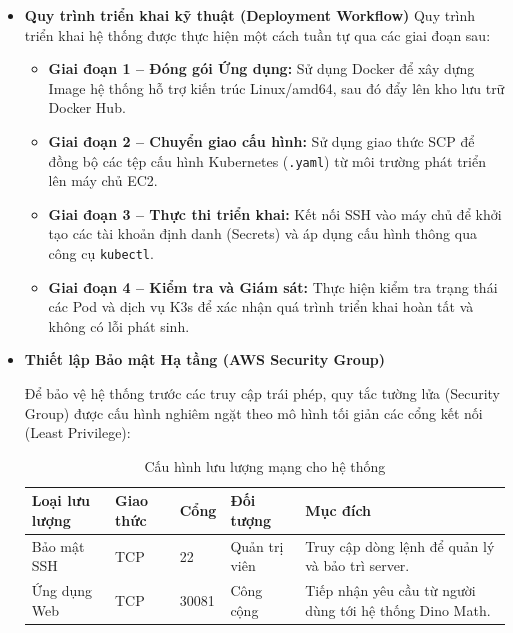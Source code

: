 \begin{itemize}
\begin{enumerate}
	\end{enumerate}
	
	\item \textbf{Quy trình triển khai kỹ thuật (Deployment Workflow)}
	Quy trình triển khai hệ thống được thực hiện một cách tuần tự qua các giai đoạn sau:
	
	\begin{itemize}
		\item \textbf{Giai đoạn 1 -- Đóng gói Ứng dụng:} Sử dụng Docker để xây dựng
		Image hệ thống hỗ trợ kiến trúc Linux/amd64, sau đó đẩy lên kho lưu trữ
		Docker Hub.
		\item \textbf{Giai đoạn 2 -- Chuyển giao cấu hình:} Sử dụng giao thức SCP để
		đồng bộ các tệp cấu hình Kubernetes (\texttt{.yaml}) từ môi trường phát
		triển lên máy chủ EC2.
		\item \textbf{Giai đoạn 3 -- Thực thi triển khai:} Kết nối SSH vào máy chủ để
		khởi tạo các tài khoản định danh (Secrets) và áp dụng cấu hình thông qua
		công cụ \texttt{kubectl}.
		\item \textbf{Giai đoạn 4 -- Kiểm tra và Giám sát:} Thực hiện kiểm tra trạng
		thái các Pod và dịch vụ K3s để xác nhận quá trình triển khai hoàn tất và
		không có lỗi phát sinh.
	\end{itemize}
	
	\item \textbf{Thiết lập Bảo mật Hạ tầng (AWS Security Group)}
	
	Để bảo vệ hệ thống trước các truy cập trái phép, quy tắc tường lửa (Security
	Group) được cấu hình nghiêm ngặt theo mô hình tối giản các cổng kết nối (Least
	Privilege):
	
	\vspace{0.5em}
	\begin{table}[ht]
		\centering
		\renewcommand{\arraystretch}{1.4} %
		\begin{tabularx}{\textwidth}{l l l l X}
			\toprule
			\textbf{Loại lưu lượng} & \textbf{Giao thức} & \textbf{Cổng} & \textbf{Đối tượng} & \textbf{Mục đích} \\
			\midrule
			Bảo mật SSH & TCP & 22 & Quản trị viên & Truy cập dòng lệnh để quản lý và bảo trì server. \\
			Ứng dụng Web & TCP & 30081 & Công cộng & Tiếp nhận yêu cầu từ người dùng tới hệ thống Dino Math. \\
			\bottomrule
		\end{tabularx}
		\caption{Cấu hình lưu lượng mạng cho hệ thống}
	\end{table}
	\vspace{0.5em}
	
\end{itemize}


